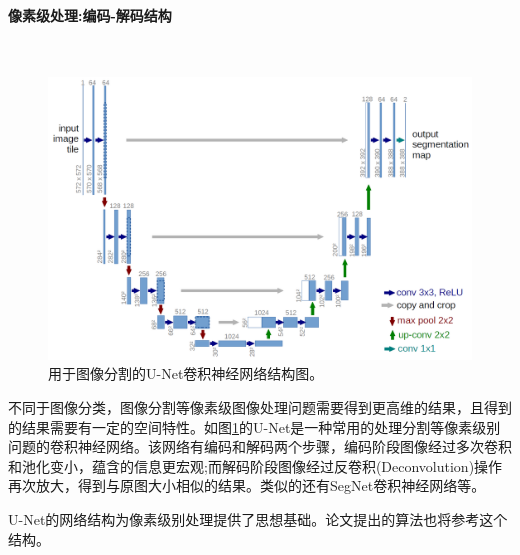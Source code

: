 \paragraph{像素级处理:编码-解码结构}\ \par
\begin{figure}[htbp!]
    \centering
    \includegraphics[width = 1.\textwidth]{chap/img/u-net-architecture.png}
    \caption{
        用于图像分割的U-Net\supercite{ronneberger2015u}卷积神经网络结构图。
        }\label{fig:unet_architecture}
\end{figure}
\par
不同于图像分类，图像分割等像素级图像处理问题需要得到更高维的结果，且得到的结果需要有一定的空间特性。如图\ref{fig:unet_architecture}的U-Net是一种常用的处理分割等像素级别问题的卷积神经网络。该网络有编码和解码两个步骤，编码阶段图像经过多次卷积和池化变小，蕴含的信息更宏观;而解码阶段图像经过反卷积(Deconvolution)操作再次放大，得到与原图大小相似的结果。类似的还有SegNet\supercite{badrinarayanan2017segnet}卷积神经网络等。
\par
U-Net的网络结构为像素级别处理提供了思想基础。论文提出的算法也将参考这个结构。
\par

